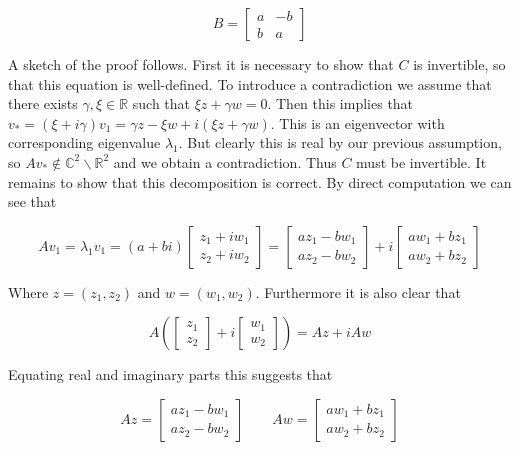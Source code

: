 \documentclass{article}
\begin{document}
\begin{equation*}
	B = 
	\begin{bmatrix}
		a & -b \\ b & a
	\end{bmatrix}
\end{equation*}

A sketch of the proof follows. First it is necessary to show that $C$ is invertible, so that 
this equation is well-defined. To introduce a contradiction we assume that there exists $\gamma,\xi \in \mathbb{R}$ such that 
$\xi z + \gamma w = 0$. Then this implies that $v_* = (\xi + i\gamma)v_1 = \gamma z - \xi w + i(\xi z + \gamma w)$. 
This is an eigenvector with corresponding eigenvalue $\lambda_1$. But clearly this is real by 
our previous assumption, so $Av_* \notin \mathbb{C}^2\backslash\mathbb{R}^2$ and we obtain a contradiction. Thus 
$C$ must be invertible. It remains to show that this decomposition is correct. By direct 
computation we can see that 

\begin{equation*}
	Av_1 = \lambda_1v_1 = (a+bi)
	\begin{bmatrix}
		z_1 + iw_1 \\ z_2 + iw_2
	\end{bmatrix}
	=
	\begin{bmatrix}
		az_1-bw_1 \\ az_2 - bw_2
	\end{bmatrix}
	+ i
	\begin{bmatrix}
		aw_1 + bz_1 \\ aw_2 + bz_2
	\end{bmatrix}
\end{equation*}

Where $z = (z_1,z_2)$ and $w = (w_1,w_2)$. Furthermore it is also clear that

\begin{equation*}
	A\left(
		\begin{bmatrix}
			z_1 \\ z_2
		\end{bmatrix}
		+ i
		\begin{bmatrix}
			w_1 \\ w_2
		\end{bmatrix}
	\right)
	= 
	Az + iAw
\end{equation*}

Equating real and imaginary parts this suggests that 

\begin{equation*}
	Az = 
	\begin{bmatrix}
		az_1-bw_1 \\ az_2 - bw_2
	\end{bmatrix}
	\qquad 
	Aw = 
	\begin{bmatrix}
		aw_1 + bz_1 \\ aw_2 + bz_2
	\end{bmatrix}
\end{equation*}
\end{document}
